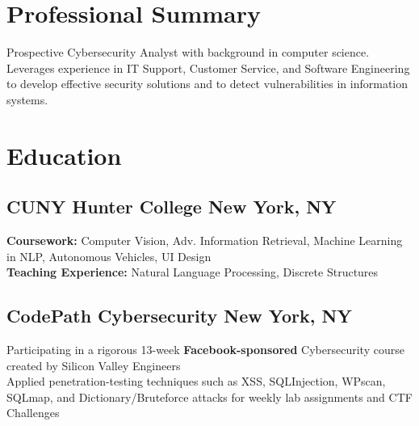 \documentclass[a4paper]{Resume}
\begin{document}

\descript{}
\begin{onehalfspace} 
\section{Professional Summary}
\hrulefill

 Prospective Cybersecurity Analyst with background in computer science.  Leverages experience in IT Support, Customer Service, and Software Engineering to develop effective security solutions and to detect vulnerabilities in information systems.   
\sectionsep

\section{Education}
\hrulefill

\subsection{CUNY Hunter College \hfill \normalfont New York, NY}



\pt \textbf{Coursework:} Computer Vision, Adv. Information Retrieval, Machine Learning in NLP, Autonomous Vehicles, UI Design \\
\pt \textbf{Teaching Experience:} Natural Language Processing, Discrete Structures
\sectionsep

\subsection{CodePath Cybersecurity \hfill \normalfont New York, NY}

\pt Participating in a rigorous 13-week \textbf{Facebook-sponsored} Cybersecurity course created by Silicon Valley Engineers  \\
\pt Applied penetration-testing techniques such as XSS, SQLInjection, WPscan, SQLmap, and Dictionary/Bruteforce attacks for weekly lab assignments and CTF Challenges
\sectionsep




\end{onehalfspace}
\end{document}
